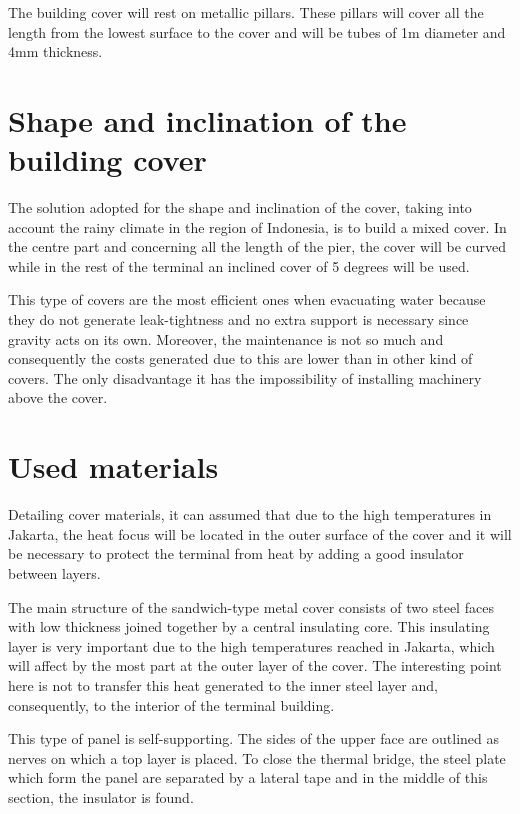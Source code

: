 The building cover will rest on metallic pillars. These pillars will cover all the length from the lowest surface to the cover and will be tubes of 1m diameter and 4mm thickness.
	
	\section{Shape and inclination of the building cover}
	
The solution adopted for the shape and inclination of the cover, taking into account the rainy climate in the region of Indonesia, is to build a mixed cover. In the centre part and concerning all the length of the pier, the cover will be curved while in the rest of the terminal an inclined cover of 5 degrees will be used.

This type of covers are the most efficient ones when evacuating water because they do not generate leak-tightness and no extra support is necessary since gravity acts on its own. Moreover, the maintenance is not so much and consequently the costs generated due to this are lower than in other kind of covers. The only disadvantage it has the impossibility of installing machinery above the cover.

	\section{Used materials}
	
Detailing cover materials, it can assumed that due to the high temperatures in Jakarta, the heat focus will be located in the outer surface of the cover and it will be necessary to protect the terminal from heat by adding a good insulator between layers.

The main structure of the sandwich-type metal cover consists of two steel faces with low thickness joined together by a central insulating core. This insulating layer is very important due to the high temperatures reached in Jakarta, which will affect by the most part at the outer layer of the cover. The interesting point here is not to transfer this heat generated to the inner steel layer and, consequently, to the interior of the terminal building.

This type of panel is self-supporting. The sides of the upper face are outlined as nerves on which a top layer is placed. To close the thermal bridge, the steel plate which form the panel are separated by a lateral tape and in the middle of this section, the insulator is found. 

